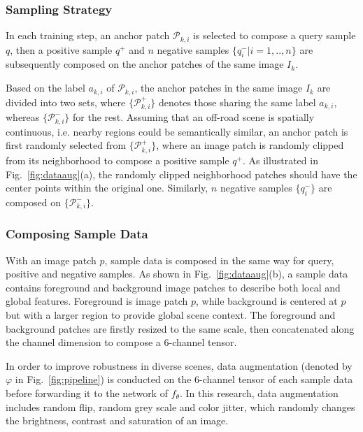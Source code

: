 \documentclass[letterpaper, 10 pt, conference]{ieeeconf}  %
\begin{document}
\subsubsection {Sampling Strategy}

In each training step, an anchor patch $\mathcal{P}_{k,i}$ is selected to compose a query sample $q$, then a positive sample $q^+$ and $n$ negative samples $\{q^-_i|i=1,..,n\}$ are subsequently composed on the anchor patches of the same image $I_k$.

Based on the label $a_{k,i}$ of $\mathcal{P}_{k,i}$, the anchor patches in the same image $I_k$ are divided into two sets, where $\{\mathcal{P}_{k,i}^+\}$ denotes those sharing the same label $a_{k,i}$, whereas $\{\mathcal{P}_{k,i}^-\}$ for the rest.
Assuming that an off-road scene is spatially continuous, i.e. nearby regions could be semantically similar, an anchor patch is first randomly selected from $\{\mathcal{P}_{k,i}^+\}$, where an image patch is randomly clipped from its neighborhood to compose a positive sample $q^+$. As illustrated in Fig.~\ref{fig:dataaug}(a), the randomly clipped neighborhood patches should have the center points within the original one. Similarly, $n$ negative samples $\{q^-_i\}$ are composed on $\{\mathcal{P}_{k,i}^-\}$.

\subsubsection{Composing Sample Data}

With an image patch $p$, sample data is composed in the same way for query, positive and negative samples.
As shown in Fig.~\ref{fig:dataaug}(b), a sample data contains foreground and background image patches to describe both local and global features. Foreground is image patch $p$, while background is centered at $p$ but with a larger region to provide global scene context. The foreground and background patches are firstly resized to the same scale, then concatenated along the channel dimension to compose a 6-channel tensor.

In order to improve robustness in diverse scenes, data augmentation (denoted by $\varphi$ in Fig.~\ref{fig:pipeline}) is conducted on the 6-channel tensor of each sample data before forwarding it to the network of $f_{\theta}$. In this research, data augmentation includes random flip, random grey scale and color jitter, which randomly changes the brightness, contrast and saturation of an image.
\end{document}
